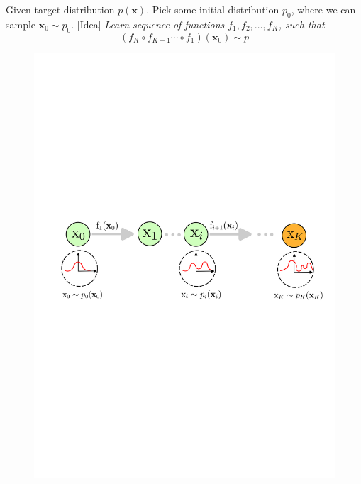 \documentclass{beamer}
\begin{document}
\begin{frame}
    \vspace*{.5cm}
    Given target distribution \( p(\mathbf{x}) \). Pick some initial distribution \( p_{0} \), where we can sample \( \mathbf{x}_0 \sim p_{0} \).
    [Idea]{
 \emph{Learn sequence of functions \( f_{1}, f_{2}, \ldots, f_{K} \), such that} \[ (f_{K} \circ f_{K - 1} \cdots \circ f_{1})(\mathbf{x}_0) \sim p \]
}
    \vspace*{-6.5cm}
    \hspace*{-1cm}
    \begin{figure}
        \centering
        \includegraphics[width=\linewidth]{figures/normalizing-flow.png}
    \end{figure}
\end{frame}
\end{document}
